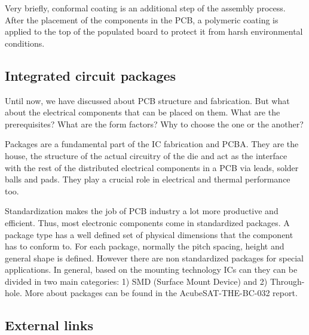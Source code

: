 \documentclass[final]{cubedoc}
\begin{document}
	Very briefly, conformal coating is an additional step of the assembly process. After the placement of the components in the PCB, a polymeric coating is applied to the top of the populated board to protect it from harsh environmental conditions.
	
	\subsection{Integrated circuit packages}
	
	Until now, we have discussed about PCB structure and fabrication. But what about the electrical components that can be placed on them. What are the prerequisites? What are the form factors? Why to choose the one or the another?
	
	Packages are a fundamental part of the IC fabrication and PCBA. They are the house, the structure of the actual circuitry of the die and act as the interface with the rest of the distributed electrical components in a PCB via leads, solder balls and pads. They play a crucial role in electrical and thermal performance too.
	
	Standardization makes the job of PCB industry a lot more productive and efficient. Thus, most electronic components come in standardized packages. A package type has a well defined set of physical dimensions that the component has to conform to. For each package, normally the pitch spacing, height and general shape is defined. However there are non standardized packages for special applications. In general, based on the mounting technology ICs can they can be divided in two main categories: 1) SMD (Surface Mount Device) and 2) Through-hole. More about packages can be found in the AcubeSAT-THE-BC-032 report.
	
	\subsection{External links} %
	
\end{document}
